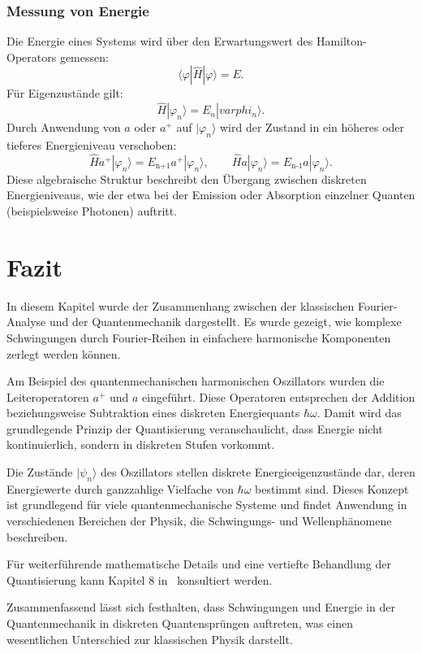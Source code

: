 		\subsubsection{Messung von Energie\label{fourier:subsubsection:MessungQuantisierterEnergie}}
			Die Energie eines Systems wird über den Erwartungswert des Hamilton-Operators gemessen:
			\begin{equation}
				\langle\varphi|\hat{H}|\varphi\rangle = E.
			\end{equation}
			Für Eigenzustände gilt:
			\begin{equation}
				\hat{H}|\varphi_n\rangle = E_n|varphi_n\rangle.
			\end{equation}
			Durch Anwendung von $a$ oder $a^+$ auf $|\varphi_n\rangle$ wird der Zustand in ein höheres oder tieferes Energieniveau verschoben:
			\[
				\hat{H}a^+|\varphi_n\rangle = E_\text{n+1}a^+|\varphi_n\rangle, \qquad \hat{H}a|\varphi_n\rangle = E_\text{n-1}a|\varphi_n\rangle.
			\]
			Diese algebraische Struktur beschreibt den Übergang zwischen diskreten Energieniveaus, wie der etwa bei der Emission oder Absorption einzelner Quanten (beispielsweise Photonen) auftritt.

\section{Fazit\label{fourier:section:fazit}}
	In diesem Kapitel wurde der Zusammenhang zwischen der klassischen Fourier-Analyse und der Quantenmechanik dargestellt.
	Es wurde gezeigt, wie komplexe Schwingungen durch Fourier-Reihen in einfachere harmonische Komponenten zerlegt werden können.

	Am Beispiel des quantenmechanischen harmonischen Oszillators wurden die Leiteroperatoren $a^+$ und $a$ eingeführt.
	Diese Operatoren entsprechen der Addition beziehungsweise Subtraktion eines diskreten Energiequants $\hbar \omega$.
	Damit wird das grundlegende Prinzip der Quantisierung veranschaulicht, dass Energie nicht kontinuierlich, sondern in diskreten Stufen vorkommt.

	Die Zustände $|\psi_n\rangle$ des Oszillators stellen diskrete Energieeigenzustände dar, deren Energiewerte durch ganzzahlige Vielfache von $\hbar \omega$ bestimmt sind.
	Dieses Konzept ist grundlegend für viele quantenmechanische Systeme und findet Anwendung in verschiedenen Bereichen der Physik, die Schwingungs- und Wellenphänomene beschreiben.

	Für weiterführende mathematische Details und eine vertiefte Behandlung der Quantisierung kann Kapitel 8 in~\cite{fourier:quantenmechanik} konsultiert werden.

	Zusammenfassend lässt sich festhalten, dass Schwingungen und Energie in der Quantenmechanik in diskreten Quantensprüngen auftreten, was einen wesentlichen Unterschied zur klassischen Physik darstellt.
